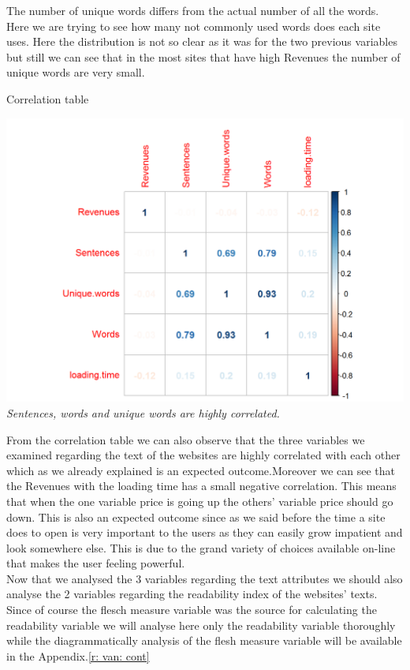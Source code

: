 \documentclass{book}
\begin{document}
The number of unique words differs from the actual number of all the words. Here we are trying to see how many not commonly used words does each site uses. Here the distribution is not so clear as it was for the two previous variables but still we can see that in the most sites that have high Revenues the number of unique words are very small. 
\begin{table}[H]
\centering
\caption{Correlation table}
\begin{center}
\includegraphics[scale=0.5]{../R/photos/38_words_corr.png}    \\
\textit{Sentences, words and unique words are highly correlated.}
\end{center}
\end{table}
From the correlation table we can also observe that the three variables we examined regarding the text of the websites are highly correlated with each other which as we already explained is an expected outcome.Moreover we can see that the Revenues with the loading time has a small negative correlation. This means that when the one variable price is going up the others' variable price should go down. This is also an expected outcome since as we said before the time a site does to open is very important to the users as they can easily grow impatient and look somewhere else. This is due to the grand variety of choices available on-line that makes the user feeling powerful.\\
Now that we analysed the 3 variables regarding the text attributes we should also analyse the 2 variables regarding the readability index of the websites' texts. Since of course the flesch measure variable was the source for calculating the readability variable we will analyse here only the readability variable thoroughly while the diagrammatically analysis of the flesh measure variable will be available in the Appendix.\ref{r: van: cont}
\end{document}
